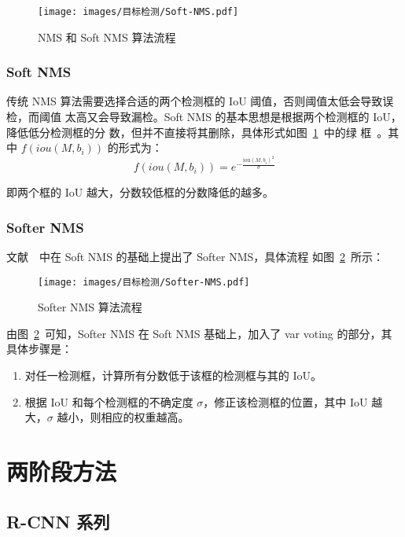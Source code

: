 \begin{figure}[ht]
  \centering
  \texttt{[image: images/目标检测/Soft-NMS.pdf]}
  \caption{NMS 和 Soft NMS 算法流程}
  \label{fig:nms-algo}
\end{figure}

\subsection{Soft NMS}

传统 NMS 算法需要选择合适的两个检测框的 IoU 阈值，否则阈值太低会导致误检，而阈值
太高又会导致漏检。Soft NMS 的基本思想是根据两个检测框的 IoU，降低低分检测框的分
数，但并不直接将其删除，具体形式如图~\ref{fig:nms-algo}~中的绿
框~。其中 $f(iou(M, b_i))$ 的形式为：
\begin{equation}
f(iou(M, b_i)) = e^{-\frac{\mathrm{iou}(M, b_i)^2}{\sigma}}
\end{equation}

即两个框的 IoU 越大，分数较低框的分数降低的越多。

\subsection{Softer NMS}
文献~~中在 Soft NMS 的基础上提出了 Softer NMS，具体流程
如图~\ref{fig:softer-nms}~所示：

\begin{figure}[ht]
  \centering
  \texttt{[image: images/目标检测/Softer-NMS.pdf]}
  \caption{Softer NMS 算法流程}
  \label{fig:softer-nms}
\end{figure}

由图~\ref{fig:softer-nms}~可知，Softer NMS 在 Soft NMS 基础上，加入了 var voting
的部分，其具体步骤是：

\begin{enumerate}
  \item 对任一检测框，计算所有分数低于该框的检测框与其的 IoU。
  \item 根据 IoU 和每个检测框的不确定度 $\sigma$，修正该检测框的位置，其中 IoU
    越大，$ \sigma $ 越小，则相应的权重越高。
\end{enumerate}

\chapter{两阶段方法}
\section{R-CNN 系列}
\label{sec:R-CNN}

